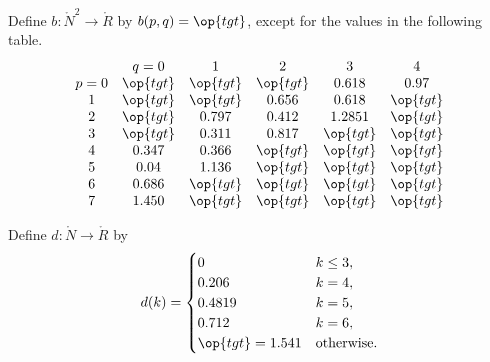 \begin{definition}[b]
Define $b:\ring{N}^2\to \ring{R}$ by $b(p,q)=\op{tgt}$,
except for the values in the following table.
{
\def\tx{\op{tgt}}
\[ \begin{matrix}  &q=0&1&2&3&4\\
p=0&\tx&\tx&\tx&0.618&0.97\\
1&\tx&\tx&0.656&0.618&\tx\\
2&\tx&0.797&0.412&1.2851&\tx\\
3&\tx&0.311&0.817&\tx&\tx\\
4&0.347&0.366&\tx&\tx&\tx\\
5&0.04&1.136&\tx&\tx&\tx\\
6&0.686&\tx&\tx&\tx&\tx\\
7&1.450&\tx&\tx&\tx&\tx
\end{matrix}
\] 
}
%
\end{definition}


\begin{definition}[d]
Define $d:\ring{N}\to \ring{R}$ by
\[ d(k) = \begin{cases}
0 & k\le3, \\
0.206 & k=4, \\
0.4819 & k=5, \\
0.712 & k=6, \\  %
\op{tgt}=1.541 & \text{otherwise}.
\end{cases}
\] 
%
\end{definition}




